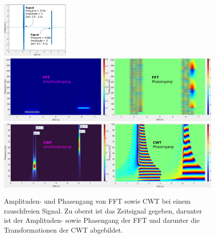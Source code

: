 \begin{figure}
	\centering
	\includegraphics[width=0.3\textwidth]{papers/wavelets/images/18-1_CWTvsFFTSignal.png}
	\includegraphics[width=\textwidth]{papers/wavelets/images/18-2_FFTnoiseFree.png}
	\includegraphics[width=\textwidth]{papers/wavelets/images/18-3_CWTnoiseFree.png}
	\caption{Amplituden- und Phasengang von FFT sowie CWT bei einem rauschfreien Signal. Zu oberst ist das Zeitsignal gegeben, darunter ist der Amplituden- sowie Phasengang der FFT und darunter die Transformationen der CWT abgebildet.}
	\label{wavelet:fig:FFTnoiseFree}
\end{figure}

	
